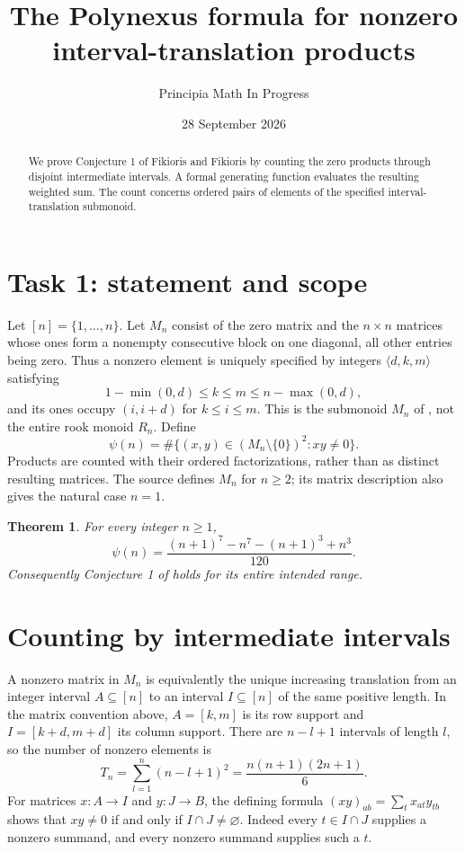 \documentclass[11pt]{article}
\title{The Polynexus formula for nonzero interval-translation products}
\author{Principia Math In Progress}
\date{28 September 2026}
\newtheorem{theorem}{Theorem}
\begin{document}
\maketitle
\begin{abstract}
We prove Conjecture 1 of Fikioris and Fikioris by counting the zero
products through disjoint intermediate intervals. A formal generating
function evaluates the resulting weighted sum. The count concerns ordered
pairs of elements of the specified interval-translation submonoid.
\end{abstract}

\section*{Task 1: statement and scope}
Let $[n]=\{1,\ldots,n\}$. Let $M_n$ consist of the zero matrix and the
$n\times n$ matrices whose ones form a nonempty consecutive block on one
diagonal, all other entries being zero. Thus a nonzero element is uniquely
specified by integers $\langle d,k,m\rangle$ satisfying
\begin{equation}\label{domain}
 1-\min(0,d)\le k\le m\le n-\max(0,d),
\end{equation}
and its ones occupy $(i,i+d)$ for $k\le i\le m$. This is the submonoid
$M_n$ of \cite{FF}, not the entire rook monoid $R_n$. Define
\[
 \psi(n)=\#\{(x,y)\in(M_n\setminus\{0\})^2:xy\ne0\}.
\]
Products are counted with their ordered factorizations, rather than as
distinct resulting matrices. The source defines $M_n$ for $n\ge2$; its
matrix description also gives the natural case $n=1$.

\begin{theorem}\label{main}
For every integer $n\ge1$,
\begin{equation}\label{answer}
 \psi(n)=\frac{(n+1)^7-n^7-(n+1)^3+n^3}{120}.
\end{equation}
Consequently Conjecture 1 of \cite[Section 8, p.~207]{FF} holds for its
entire intended range.
\end{theorem}

\section*{Counting by intermediate intervals}
A nonzero matrix in $M_n$ is equivalently the unique increasing
translation from an integer interval $A\subseteq[n]$ to an interval
$I\subseteq[n]$ of the same positive length. In the matrix convention
above, $A=[k,m]$ is its row support and $I=[k+d,m+d]$ its column support.
There are $n-l+1$ intervals of length $l$, so the number of nonzero
elements is
\begin{equation}\label{total}
 T_n=\sum_{l=1}^n(n-l+1)^2=\frac{n(n+1)(2n+1)}6.
\end{equation}
For matrices $x:A\to I$ and $y:J\to B$, the defining formula
$(xy)_{ab}=\sum_t x_{at}y_{tb}$ shows that $xy\ne0$ if and only if
$I\cap J\ne\varnothing$. Indeed every $t\in I\cap J$ supplies a
nonzero summand, and every nonzero summand supplies such a $t$.
\end{document}
